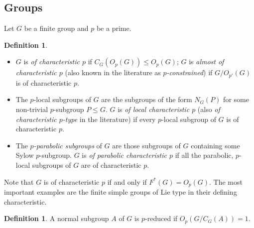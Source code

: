 \documentclass{amsart}
\numberwithin{equation}{section}
\theoremstyle{definition}
\newtheorem{definition}[equation]{Definition}
\theoremstyle{subresult}
\theoremstyle{caseresult}
\newcommand{\bF}{\mathbb{F}}
\newcommand{\Aut}{\operatorname{Aut}}
\newcommand{\<}{\langle}
\renewcommand{\>}{\rangle}
\begin{document}
\begin{itemize}
	\end{itemize} 



\subsection{Groups}
Let $G$ be a finite group and $p$ be a prime.
\begin{definition}
    \begin{itemize}
    \item $G$ is \emph{of characteristic $p$} if $C_G(O_p(G)) \le O_p(G)$; $G$ is \emph{almost of characteristic $p$} (also known in the literature as \emph{$p$-constrained}) if $G/O_{p'}(G)$ is of characteristic $p$.
    \item The $p$-local subgroups of $G$ are the subgroups of the form $N_G(P)$ for some non-trivial $p$-subgroup $P \le G$.    $G$ is \emph{of local characteristic $p$} (also \emph{of characteristic $p$-type} in the literature) if every $p$-local subgroup of $G$ is of characteristic $p$.
    \item The \emph{$p$-parabolic subgroups} of $G$ are those subgroups of $G$ containing some Sylow $p$-subgroup. $G$ is \emph{of parabolic characteristic $p$} if all the parabolic, $p$-local subgroups of $G$ are of characteristic $p$.
    \end{itemize}
\end{definition}
Note that $G$ is of characteristic $p$ if and only if $F^*(G) = O_p(G)$. The most important examples are the finite simple groups of Lie type in their defining characteristic.

\vspace*{0.6cm}
\begin{definition}
	\label{definition of p reduced}
    A normal subgroup $A$ of $G$ is $p$-reduced if $O_p(G/C_G(A)) = 1$.
\end{definition}
\end{document}
